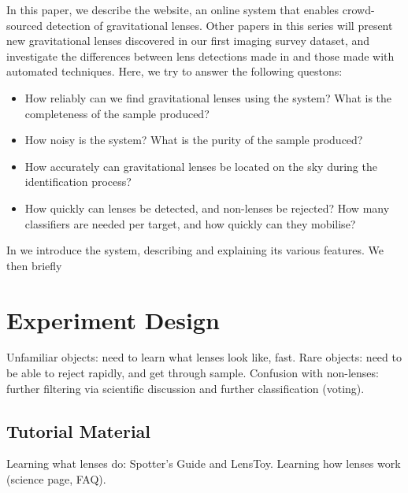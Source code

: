 \documentclass[useAMS,usenatbib,a4paper]{mn2e}
\begin{document}
In this paper, we describe the \sw website, an online system that
enables crowd-sourced detection of gravitational lenses. 
Other papers in this series will present new gravitational lenses
discovered in our first imaging survey dataset, and investigate the
differences between lens detections made in \sw and those made with
automated techniques. Here, we try to answer the following questons:
\begin{itemize}

\item How reliably can we find gravitational lenses using the \sw
system? What is the completeness of the sample produced?

\item How noisy is the system? What is the purity of the sample
produced?

\item How accurately can gravitational lenses be located on the sky
during the identification process?

\item How quickly can lenses be detected, and non-lenses be rejected?
How many classifiers are needed per target, and how quickly can they
mobilise?

\end{itemize}

In  we introduce the \sw system, describing and
explaining its various features. We then briefly 




\section{Experiment Design}
\label{sec:design}

Unfamiliar objects: need to learn what lenses look like, fast. Rare
objects: need to be able to reject rapidly, and get through sample.
Confusion with non-lenses: further filtering via scientific discussion
and further classification (voting). 


\subsection{Tutorial Material}
\label{sec:design:tutorial}

Learning what lenses do: Spotter's Guide and LensToy. Learning how
lenses work (science page, FAQ). 
\end{document}
